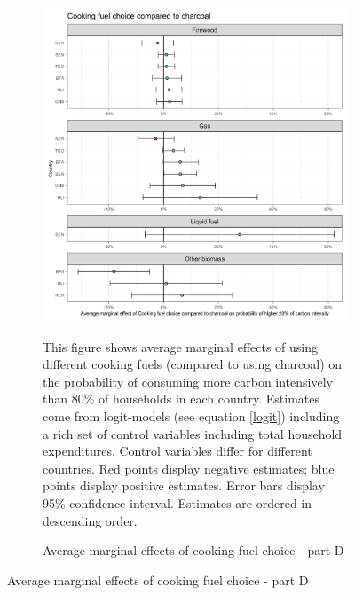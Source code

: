  \begin{figure}[ht!]\ContinuedFloat
   \centering
   \begin{subfigure}[b]{\textwidth}
   \centering
   \caption{Average marginal effects of cooking fuel choice - part D} \label{fig:Logit_ME_CF_4}
   \includegraphics{1_Figures/Analysis_Logit_Models_Marginal_Effects/Average_Marginal_Effects_affected_upper_80_CF_Charcoal_2017.jpg}
   \begin{subcaption2}
     This figure shows average marginal effects of using different cooking fuels (compared to using charcoal) on the probability of consuming more carbon intensively than 80\% of households in each country. Estimates come from logit-models (see equation \ref{logit}) including a rich set of control variables including total household expenditures. Control variables differ for different countries. Red points display negative estimates; blue points display positive estimates. Error bars display 95\%-confidence interval. Estimates are ordered in descending order.
   \end{subcaption2}
   \end{subfigure}
 \end{figure}
 \clearpage
